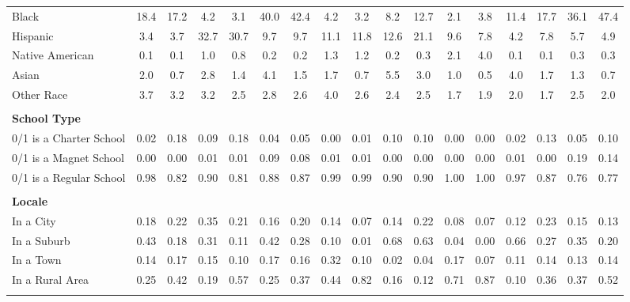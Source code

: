 \begin{tabular*}{\linewidth}{@{\extracolsep{\fill} } lcccccccccccccccc}
\hspace{0.2cm}Black&18.4&17.2&4.2&3.1&40.0&42.4&4.2&3.2&8.2&12.7&2.1&3.8&11.4&17.7&36.1&47.4\\%
\hspace{0.2cm}Hispanic&3.4&3.7&32.7&30.7&9.7&9.7&11.1&11.8&12.6&21.1&9.6&7.8&4.2&7.8&5.7&4.9\\%
\hspace{0.2cm}Native American&0.1&0.1&1.0&0.8&0.2&0.2&1.3&1.2&0.2&0.3&2.1&4.0&0.1&0.1&0.3&0.3\\%
\hspace{0.2cm}Asian&2.0&0.7&2.8&1.4&4.1&1.5&1.7&0.7&5.5&3.0&1.0&0.5&4.0&1.7&1.3&0.7\\%
\hspace{0.2cm}Other Race&3.7&3.2&3.2&2.5&2.8&2.6&4.0&2.6&2.4&2.5&1.7&1.9&2.0&1.7&2.5&2.0\\%
&&&&&&&&&&&&&&&&\\%
\multicolumn{17}{l}{\bfseries School Type}\\%
\hspace{0.2cm}0/1 is a Charter School&0.02&0.18&0.09&0.18&0.04&0.05&0.00&0.01&0.10&0.10&0.00&0.00&0.02&0.13&0.05&0.10\\%
\hspace{0.2cm}0/1 is a Magnet School&0.00&0.00&0.01&0.01&0.09&0.08&0.01&0.01&0.00&0.00&0.00&0.00&0.01&0.00&0.19&0.14\\%
\hspace{0.2cm}0/1 is a Regular School&0.98&0.82&0.90&0.81&0.88&0.87&0.99&0.99&0.90&0.90&1.00&1.00&0.97&0.87&0.76&0.77\\%
&&&&&&&&&&&&&&&&\\%
\multicolumn{17}{l}{\bfseries Locale}\\%
\hspace{0.2cm}In a City&0.18&0.22&0.35&0.21&0.16&0.20&0.14&0.07&0.14&0.22&0.08&0.07&0.12&0.23&0.15&0.13\\%
\hspace{0.2cm}In a Suburb&0.43&0.18&0.31&0.11&0.42&0.28&0.10&0.01&0.68&0.63&0.04&0.00&0.66&0.27&0.35&0.20\\%
\hspace{0.2cm}In a Town&0.14&0.17&0.15&0.10&0.17&0.16&0.32&0.10&0.02&0.04&0.17&0.07&0.11&0.14&0.13&0.14\\%
\hspace{0.2cm}In a Rural Area&0.25&0.42&0.19&0.57&0.25&0.37&0.44&0.82&0.16&0.12&0.71&0.87&0.10&0.36&0.37&0.52\\%
&&&&&&&&&&&&&&&&\\%
\hline%
\end{tabular*}